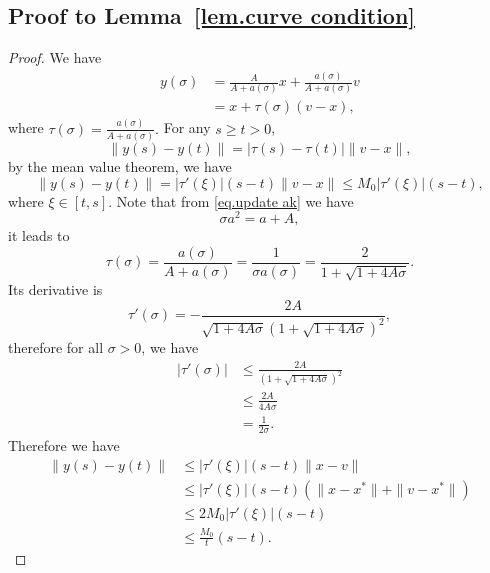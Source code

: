\documentclass{mcom-l}
\numberwithin{equation}{section}
\begin{document}
\subsection*{Proof to Lemma~\ref{lem.curve condition}}
\begin{proof}
    We have
    \begin{equation*}
        \begin{aligned}
            y(\sigma) & = \frac{A}{A+a(\sigma)}x+\frac{a(\sigma)}{A+a(\sigma)}v \\
                      & = x + \tau (\sigma) (v-x),
        \end{aligned}
    \end{equation*}
    where $\tau(\sigma) = \frac{a(\sigma)}{A+a(\sigma)}.$ For any $s\geq t>0$,
    \begin{equation*}
        \|y(s)-y(t)\| = \left|\tau(s)-\tau(t)\right| \|v-x\|,
    \end{equation*}
    by the mean value theorem, we have
    \begin{equation*}
        \|y(s)-y(t)\| = \left|\tau'(\xi)\right|(s-t) \|v-x\|\leq M_0\left|\tau'(\xi)\right|(s-t),
    \end{equation*}
    where $\xi \in \left[t,s\right]$. Note that from \eqref{eq.update ak} we have
    \begin{equation*}
        \sigma a^2=a+A,
    \end{equation*}
    it leads to
    \begin{equation*}
        \tau(\sigma) = \frac{a(\sigma)}{A+a(\sigma)} = \frac{1}{\sigma a(\sigma)} = \frac{2}{1+\sqrt{1+4A\sigma}}.
    \end{equation*}
    Its derivative is
    \begin{equation*}
        \tau'(\sigma) = -\frac{2A}{\sqrt{1+4A\sigma}\left(1+\sqrt{1+4A\sigma}\right)^2},
    \end{equation*}
    therefore for all $\sigma>0$, we have
    \begin{equation*}
        \begin{aligned}
            \left|\tau'(\sigma)\right| & \leq \frac{2A}{\left(1+\sqrt{1+4A\sigma}\right)^2} \\
                                       & \leq \frac{2A}{4A\sigma}                           \\
                                       & = \frac{1}{2\sigma}.
        \end{aligned}
    \end{equation*}
    Therefore we have
    \begin{equation*}
        \begin{aligned}
            \|y(s)-y(t)\| & \leq \left|\tau'(\xi)\right|(s-t)\|x-v\|                          \\
                          & \leq \left|\tau'(\xi)\right|(s-t)\left(\|x-x^*\|+\|v-x^*\|\right) \\
                          & \leq 2M_0\left|\tau'(\xi)\right|(s-t)                             \\
                          & \leq \frac{M_0}{t}(s-t).
        \end{aligned}
    \end{equation*}
\end{proof}


% 
\end{document}
